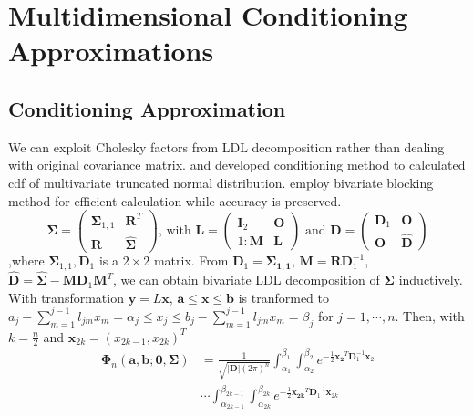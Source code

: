 \section{Multidimensional Conditioning Approximations}

\subsection{Conditioning Approximation}

We can exploit Cholesky factors from LDL decomposition rather than dealing with original covariance matrix. \citet{mendell1974multifactorial} and \citet{kamakura1989estimation} developed conditioning method to calculated cdf of multivariate truncated normal distribution. \citet{trinh2015bivariate} employ bivariate blocking method for efficient calculation while accuracy is preserved.\\
$$\boldsymbol{\Sigma} = \begin{pmatrix}
\boldsymbol{\Sigma}_{1,1} & \mathbf{R}^T\\
\mathbf{R} & \hat{\boldsymbol{\Sigma}}
\end{pmatrix}\text{, with } \mathbf{L}=\begin{pmatrix}
\mathbf{I}_{2} & \mathbf{O}\\1:
\mathbf{M} & \mathbf{L}
\end{pmatrix}\text{ and } \mathbf{D}=\begin{pmatrix}
\mathbf{D}_{1} & \mathbf{O}\\
\mathbf{O} & \mathbf{\hat{D}}
\end{pmatrix}$$
,where $\boldsymbol{\Sigma}_{1,1}, \mathbf{D}_{1}$ is a $2\times2$ matrix. From $\mathbf{D}_1=\boldsymbol{\Sigma_{1,1}}$, $\mathbf{M}=\mathbf{R}\mathbf{D}_1^{-1}$, $\mathbf{\hat{D}}=\hat{\boldsymbol{\Sigma}}-\mathbf{M}\mathbf{D}_1\mathbf{M}^T$, we can obtain bivariate LDL decomposition of $\boldsymbol{\Sigma}$ inductively.\\
With transformation $\mathbf{y}=L\mathbf{x}$, $\mathbf{a}\leq\mathbf{x}\leq\mathbf{b}$ is tranformed to $a_j-\sum_{m=1}^{j-1}l_{jm}x_m=\alpha_j\leq x_j\leq b_j-\sum_{m=1}^{j-1}l_{jm}x_m=\beta_j$ for $j=1,\cdots,n$. Then, with $k=\frac{n}{2}$ and $\mathbf{x}_{2k}=(x_{2k-1},x_{2k})^T$
\begin{align}\label{eqn:phi_cond-biv}
	\boldsymbol{\Phi}_n(\mathbf{a},\mathbf{b};\mathbf{0},\boldsymbol{\Sigma})
	&= \frac{1}{\sqrt{\lvert\mathbf{D}\rvert(2\pi)^n}}\int_{\alpha_1}^{\beta_1}\int_{\alpha_2}^{\beta_2}e^{-\frac{1}{2}\mathbf{x_2}^T\mathbf{D}_1^{-1}\mathbf{x}_2}\nonumber\\
	&\cdots \int_{\alpha_{2k-1}}^{\beta_{2k-1}}\int_{\alpha_{2k}}^{\beta_{2k}}e^{-\frac{1}{2}\mathbf{x_{2k}}^T\mathbf{D}_1^{-1}\mathbf{x}_{2k}}
\end{align}
